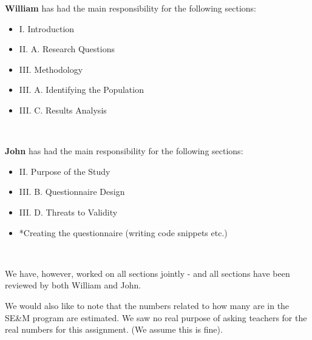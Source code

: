 \documentclass[times, 10pt,twocolumn]{Article}
\begin{document}
\vfill
\eject


\textbf{William} has had the main responsibility for the following sections:
\begin{itemize} \renewcommand{\labelitemi}{$\bullet$} 
\item I. Introduction
\item II. A. Research Questions
\item III. Methodology
\item III. A. Identifying the Population
\item III. C. Results Analysis
\end{itemize}
\ 


\textbf{John} has had the main responsibility for the following sections:
\begin{itemize} \renewcommand{\labelitemi}{$\bullet$} 
\item II. Purpose of the Study
\item III. B. Questionnaire Design
\item III. D. Threats to Validity
\item *Creating the questionnaire (writing code snippets etc.)
\end{itemize}
\

We have, however, worked on all sections jointly - and all sections have been reviewed by both William and John. 

We would also like to note that the numbers related to how many are in the SE\&M program are estimated. We saw no real purpose of asking teachers for the real numbers for this assignment. (We assume this is fine). 
\end{document}
